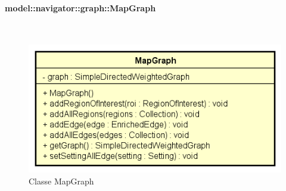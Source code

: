 \documentclass[../DefinizioneDiProdotto.tex]{subfiles}
\begin{document}
\paragraph{model::navigator::graph::MapGraph}
\
\begin{figure}[H]
	\centering
	\includegraphics[width=\maxwidth]{img/MapGraph.png}
	\caption{Classe MapGraph}\label{fig:model::navigator::graph::MapGraph} 
\end{figure}
\end{document}
